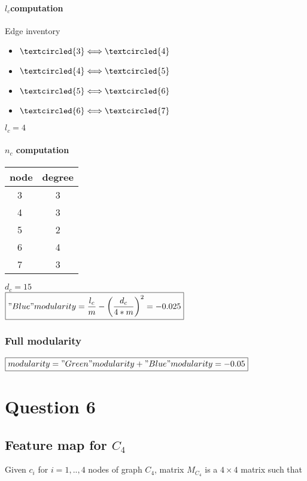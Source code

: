 \documentclass[a4paper]{article}
\begin{document}
\paragraph{$l_{c}$computation}

Edge inventory
\begin{itemize}
\item $\textcircled{3}\Longleftrightarrow \textcircled{4}$
\item $\textcircled{4}\Longleftrightarrow \textcircled{5}$
\item $\textcircled{5}\Longleftrightarrow \textcircled{6}$
\item $\textcircled{6}\Longleftrightarrow \textcircled{7}$
\end{itemize}
$\boxed{l_{c}=4}$
\paragraph{$n_{c}$ computation}

\begin{table}[h]
\begin{tabular}{|c|c|}
\hline
node&degree\\
\hline
\textcircled{3}& 3\\
\textcircled{4}& 3\\
\textcircled{5}& 2\\
\textcircled{6}& 4\\
\textcircled{7}& 3\\
\hline
\end{tabular}

\end{table}
$\boxed{d_{c}=15}$
\\

$\boxed{"Blue" modularity=\frac{l_{c}}{m} - \left(\frac{d_{c}}{4*m}\right)^{2}=-0.025}$

\subsubsection{Full modularity}
$\boxed{modularity="Green" modularity + "Blue" modularity=-0.05}$

\section{Question 6}

\subsection{Feature map for $C_{4}$}
Given $c_{i}$ for $i = 1,..,4$ nodes of graph $C_{4}$, matrix $M_{C_{4}}$ is a $ 4 \times 4$ matrix such that
\end{document}
